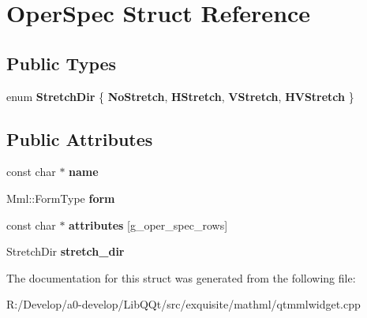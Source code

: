 \hypertarget{struct_oper_spec}{}\section{Oper\+Spec Struct Reference}
\label{struct_oper_spec}
\subsection*{Public Types}
\begin{DoxyCompactItemize}
\item 
\mbox{\label{struct_oper_spec_aaf2b1cd46d0cf751d87f736eb93941cc}} 
enum {\bfseries Stretch\+Dir} \{ {\bfseries No\+Stretch}, 
{\bfseries H\+Stretch}, 
{\bfseries V\+Stretch}, 
{\bfseries H\+V\+Stretch}
 \}
\end{DoxyCompactItemize}
\subsection*{Public Attributes}
\begin{DoxyCompactItemize}
\item 
\mbox{\label{struct_oper_spec_a58a3e665e8d6732f4cff193658512f35}} 
const char $\ast$ {\bfseries name}
\item 
\mbox{\label{struct_oper_spec_a81535e4b6e47fb014f928681ec34db43}} 
Mml\+::\+Form\+Type {\bfseries form}
\item 
\mbox{\label{struct_oper_spec_a0c58b490b09e9560f6a069fafa2a8670}} 
const char $\ast$ {\bfseries attributes} \mbox{[}g\+\_\+oper\+\_\+spec\+\_\+rows\mbox{]}
\item 
\mbox{\label{struct_oper_spec_a332e33c1cc980114c8742327112a2abe}} 
Stretch\+Dir {\bfseries stretch\+\_\+dir}
\end{DoxyCompactItemize}


The documentation for this struct was generated from the following file\+:\begin{DoxyCompactItemize}
\item 
R\+:/\+Develop/a0-\/develop/\+Lib\+Q\+Qt/src/exquisite/mathml/qtmmlwidget.\+cpp\end{DoxyCompactItemize}
